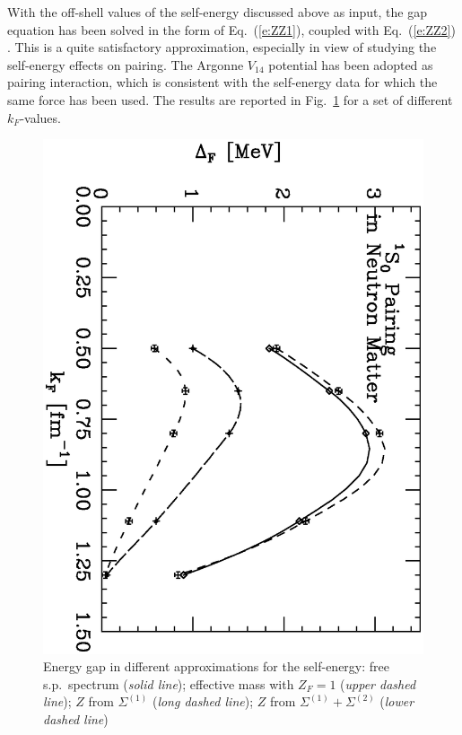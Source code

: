 \documentclass[runningheads]{svmult}
\begin{document}
With the off-shell values of the self-energy discussed above as input,
the gap equation has been solved in the form of Eq.~(\ref{e:ZZ1}), 
coupled with Eq.~(\ref{e:ZZ2}) \cite{SCK}.
This is a quite satisfactory approximation, especially in
view of studying the self-energy effects on pairing. 
The Argonne $V_{14}$ potential has been adopted as pairing interaction, 
which is consistent
with the self-energy data for which the same force has been used.
The results are reported in Fig.~\ref{f:selfen} for a set of different 
$k_F$-values. 
\begin{figure}[b] %
\includegraphics[height=.32\textheight,angle=90,bb=70 350 500 700]
{nsbk_dsi.ps}
\caption[]
{Energy gap in different approximations for the self-energy: 
free s.p.~spectrum ({\it solid line}); 
effective mass with $Z_F=1$ ({\it upper dashed line});
$Z$ from $\Sigma^{(1)}$ ({\it long dashed line}); 
$Z$ from $\Sigma^{(1)}+\Sigma^{(2)}$ ({\it lower dashed line})}
\label{f:selfen}
\end{figure} %
\end{document}
